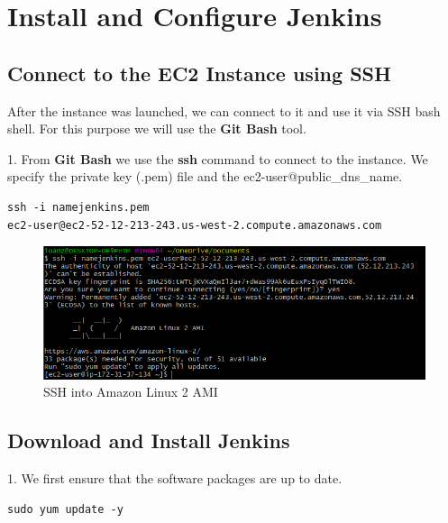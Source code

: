 \documentclass[12pt,a4paper,twoside]{article}
\begin{document}
\section{Install and Configure Jenkins}


\subsection{Connect to the EC2 Instance using SSH}


After the instance was launched, we can connect to it and use it via SSH bash shell. For this purpose we will use the \textbf{Git Bash} tool.


1. From \textbf{Git Bash} we use the \textbf{ssh} command to connect to the instance. We specify the private key (.pem) file and the ec2-user@public\_dns\_name.

\begin{verbatim}
ssh -i namejenkins.pem 
ec2-user@ec2-52-12-213-243.us-west-2.compute.amazonaws.com
\end{verbatim}

\begin{figure}[h!]
    \centering
        \includegraphics[width=15cm]{images-aws/14-ssh-connect.png}
        \caption{SSH into Amazon Linux 2 AMI}
\end{figure}


\subsection{Download and Install Jenkins}


1. We first ensure that the software packages are up to date.


\begin{verbatim}
sudo yum update -y
\end{verbatim}
\end{document}
